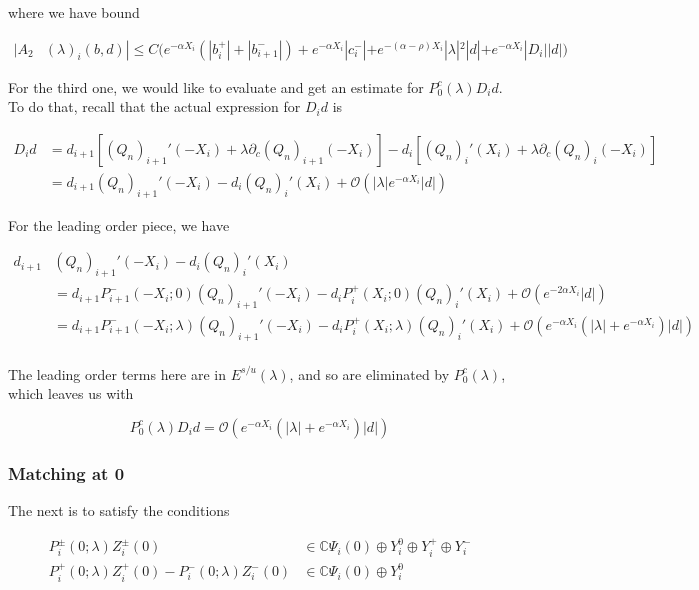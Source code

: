 \documentclass[12pt]{article}
\def\C{{\mathbb C}}
\begin{document}
where we have bound

\begin{align*}
|A_2&(\lambda)_i(b, d)|
\leq C \Big( e^{-\alpha X_i} (|b_i^+| + |b_{i+1}^-|) + e^{-\alpha X_i} |c_i^-| + e^{-(\alpha - \rho) X_i} |\lambda|^2|d| + e^{-\alpha X_i} |D_i||d| \Big)
\end{align*} 

For the third one, we would like to evaluate and get an estimate for $P_0^c(\lambda) D_i d$. To do that, recall that the actual expression for $D_i d$ is 

\begin{align*}
D_i d &= d_{i+1}[(Q_n)_{i+1}'(-X_i) + \lambda \partial_c (Q_n)_{i+1}(-X_i)]
- d_i [ (Q_n)_i'(X_i) + \lambda \partial_c (Q_n)_i(-X_i) ] \\
&= d_{i+1} (Q_n)_{i+1}'(-X_i) - d_i (Q_n)_i'(X_i) + \mathcal{O}(|\lambda|e^{-\alpha X_i}|d|)
\end{align*}

For the leading order piece, we have

\begin{align*}
d_{i+1} &(Q_n)_{i+1}'(-X_i) - d_i (Q_n)_i'(X_i) \\
&= d_{i+1} P_{i+1}^-(-X_i; 0)(Q_n)_{i+1}'(-X_i) - d_i P_i^+(X_i; 0)(Q_n)_i'(X_i) + \mathcal{O}(e^{-2 \alpha X_i}|d|) \\
&= d_{i+1} P_{i+1}^-(-X_i; \lambda)(Q_n)_{i+1}'(-X_i) - d_i P_i^+(X_i; \lambda)(Q_n)_i'(X_i) + \mathcal{O}(e^{-\alpha X_i}(|\lambda| + e^{-\alpha X_i})|d|)\\
\end{align*}

The leading order terms here are in $E^{s/u}(\lambda)$, and so are eliminated by $P_0^c(\lambda)$, which leaves us with

\[
P_0^c(\lambda) D_i d = \mathcal{O}(e^{-\alpha X_i}(|\lambda| + e^{-\alpha X_i})|d|)
\]

\subsubsection*{Matching at 0}

The next is to satisfy the conditions

\begin{align*}
P_i^\pm(0; \lambda) Z_i^\pm(0) &\in \C \Psi_i(0) \oplus Y_i^0 \oplus Y_i^+ \oplus Y_i^- \\
P_i^+(0; \lambda) Z_i^+(0) - P_i^-(0; \lambda) Z_i^-(0) &\in \C \Psi_i(0) \oplus Y_i^0
\end{align*}
\end{document}

